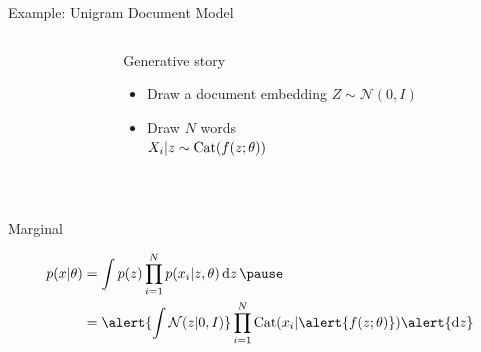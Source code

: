 \begin{frame}{Example: Unigram Document Model}


\begin{columns}
	\begin{column}{0.2\textwidth}
    \end{column}
    \begin{column}{0.75\textwidth}
    	Generative story 
    	\begin{itemize}
			\item Draw a document embedding $Z \sim \mathcal N(0, I)$
			\item Draw $N$ words\\
			$X_i|z \sim \operatorname{Cat}(f(z; \theta))$
		\end{itemize}
    \end{column}
    \end{columns}
    
    
    ~
    
	Marginal \pause
	\begin{small}
    \begin{equation*}
	\begin{aligned}						
		p(x|\theta) &= \int p(z) \prod_{i=1}^N p(x_i|z, \theta) \dd{z} \pause \\
		&= \alert{\int \mathcal N(z|0, I)} \prod_{i=1}^N \Cat(x_i|\alert{f(z; \theta)}) \alert{\dd{z}}
	\end{aligned}
	\end{equation*}
	\end{small}

\end{frame}


